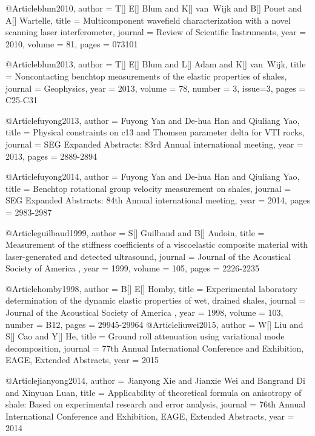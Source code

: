 @Article{blum2010,
  author = 	 {T[] E[] Blum and K[] van~Wijk and B[] Pouet and A[] Wartelle},
  title = 	 {Multicomponent wavefield characterization with a novel scanning laser interferometer},
  journal = 	 {Review of Scientific Instruments},
  year = 	 2010,
  volume = 	 81,
  pages = 	 {073101}}

@Article{blum2013,
  author = 	 {T[] E[] Blum and L[] Adam and K[] van~Wijk},
  title = 	 {Noncontacting benchtop measurements of the elastic properties of shales},
  journal = 	 {Geophysics},
  year = 	 2013,
  volume = 	 78,
  number = 	 3,
  issue=3,
  pages = 	 {C25-C31}}

@Article{fuyong2013,
  author = 	 {Fuyong Yan and De-hua Han and Qiuliang Yao},
  title = 	 {Physical constraints on c13 and Thomsen parameter delta for VTI rocks},
  journal = 	 {SEG Expanded Abstracts: 83rd Annual international meeting},
  year = 	 2013,
  pages = 	 {2889-2894}}

@Article{fuyong2014,
  author = 	 {Fuyong Yan and De-hua Han and Qiuliang Yao},
  title = 	 {Benchtop rotational group velocity measurement on shales},
  journal = 	 {SEG Expanded Abstracts: 84th Annual international meeting},
  year = 	 2014,
  pages = 	 {2983-2987}}

@Article{guilbaud1999,
  author = 	 {S[] Guilbaud and B[] Audoin},
  title = 	 {Measurement of the stiffness coefficients of a viscoelastic composite material with laser-generated and detected ultrasound},
  journal = 	 { Journal of the Acoustical Society of America },
  year = 	 1999,
  volume = 	 105,
  pages = 	 {2226-2235}}

@Article{homby1998,
  author = 	 {B[] E[] Homby},
  title = 	 {Experimental laboratory determination of the dynamic elastic properties of wet, drained shales},
  journal = 	 { Journal of the Acoustical Society of America },
  year = 	 1998,
  volume = 	 103,
  number = B12,
  pages = 	 {29945-29964}}
@Article{liuwei2015,
  author = 	 {W[] Liu and S[] Cao and Y[] He},
  title = 	 {Ground roll attenuation using variational mode decomposition},
  journal = 	 { 77th Annual International Conference and Exhibition, EAGE, Extended Abstracts},
  year = 	 2015}

  
@Article{jianyong2014,
  author = 	 {Jianyong Xie and Jianxie Wei and Bangrand Di and Xinyuan Luan},
  title = 	 {Applicability of theoretical formula on anisotropy of shale: Based on experimental research and error analysis},
  journal = 	 { 76th Annual International Conference and Exhibition, EAGE, Extended Abstracts},
  year = 	 2014}

